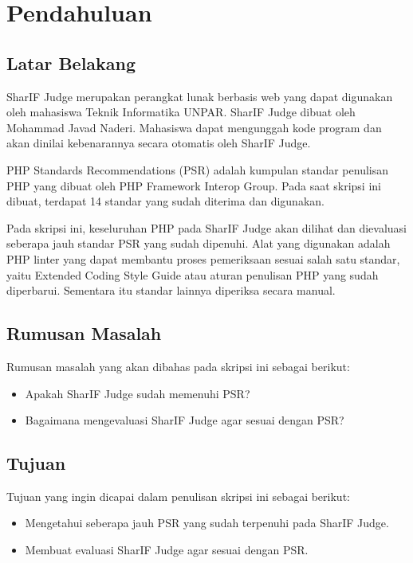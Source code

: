 \chapter{Pendahuluan}
\label{chap:intro}
   
\section{Latar Belakang}
\label{sec:label}

SharIF Judge merupakan perangkat lunak berbasis web yang dapat digunakan oleh mahasiswa Teknik Informatika UNPAR. SharIF Judge dibuat oleh Mohammad Javad Naderi. Mahasiswa dapat mengunggah kode program dan akan dinilai kebenarannya secara otomatis oleh SharIF Judge.

PHP Standards Recommendations (PSR) adalah kumpulan standar penulisan PHP yang dibuat oleh PHP Framework Interop Group. Pada saat skripsi ini dibuat, terdapat 14 standar yang sudah diterima dan digunakan.

Pada skripsi ini, keseluruhan PHP pada SharIF Judge akan dilihat dan dievaluasi seberapa jauh standar PSR yang sudah dipenuhi. Alat yang digunakan adalah PHP linter yang dapat membantu proses pemeriksaan sesuai salah satu standar, yaitu Extended Coding Style Guide atau aturan penulisan PHP yang sudah diperbarui. Sementara itu standar lainnya diperiksa secara manual. 


\section{Rumusan Masalah}
\label{sec:rumusan}
Rumusan masalah yang akan dibahas pada skripsi ini sebagai berikut:
\begin{itemize}
	\item Apakah SharIF Judge sudah memenuhi PSR?
	\item Bagaimana mengevaluasi SharIF Judge agar sesuai dengan PSR?  
\end{itemize}


\section{Tujuan}
\label{sec:tujuan}
Tujuan yang ingin dicapai dalam penulisan skripsi ini sebagai berikut:
\begin{itemize}
	\item Mengetahui seberapa jauh PSR yang sudah terpenuhi pada SharIF Judge.
	\item Membuat evaluasi SharIF Judge agar sesuai dengan PSR.
\end{itemize}

